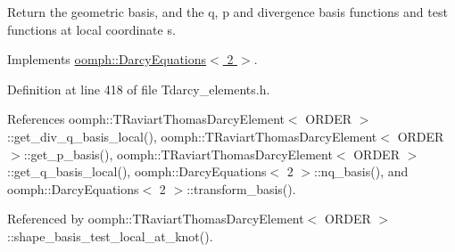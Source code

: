 Return the geometric basis, and the q, p and divergence basis functions and test functions at local coordinate s. 



Implements \hyperlink{classoomph_1_1DarcyEquations_a4052cf1c7cd03d9ea206f4cf885ef5ae}{oomph\+::\+Darcy\+Equations$<$ 2 $>$}.



Definition at line 418 of file Tdarcy\+\_\+elements.\+h.



References oomph\+::\+T\+Raviart\+Thomas\+Darcy\+Element$<$ O\+R\+D\+E\+R $>$\+::get\+\_\+div\+\_\+q\+\_\+basis\+\_\+local(), oomph\+::\+T\+Raviart\+Thomas\+Darcy\+Element$<$ O\+R\+D\+E\+R $>$\+::get\+\_\+p\+\_\+basis(), oomph\+::\+T\+Raviart\+Thomas\+Darcy\+Element$<$ O\+R\+D\+E\+R $>$\+::get\+\_\+q\+\_\+basis\+\_\+local(), oomph\+::\+Darcy\+Equations$<$ 2 $>$\+::nq\+\_\+basis(), and oomph\+::\+Darcy\+Equations$<$ 2 $>$\+::transform\+\_\+basis().



Referenced by oomph\+::\+T\+Raviart\+Thomas\+Darcy\+Element$<$ O\+R\+D\+E\+R $>$\+::shape\+\_\+basis\+\_\+test\+\_\+local\+\_\+at\+\_\+knot().

\mbox{\label{classoomph_1_1TRaviartThomasDarcyElement_afdb0540d59f54d7ef112a85a386f7991}} 
